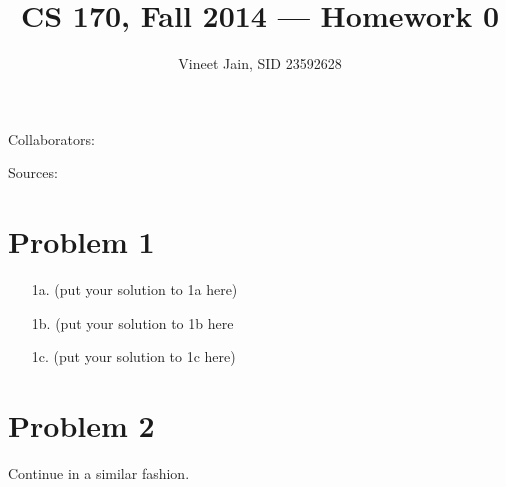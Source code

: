 \documentclass[11pt,letterpaper]{article}
\title{CS 170, Fall 2014 --- Homework 0} %
\author{Vineet Jain, SID 23592628 } %
\begin{document}
\maketitle

Collaborators: 

Sources: 

\section*{Problem 1} %
	\begin{enumerate}
		\item[1a.] (put your solution to 1a here)
		\item[1b.] (put your solution to 1b here
		\item[1c.] (put your solution to 1c here)
	\end{enumerate}

	\newpage

\section*{Problem 2}

Continue in a similar fashion.
\end{document}
